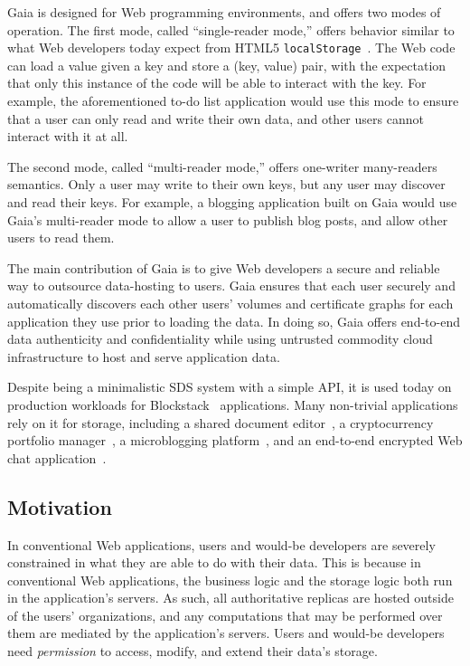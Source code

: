 Gaia is designed for Web programming environments, and offers two
modes of operation.  The first mode, called ``single-reader mode,'' offers
behavior similar to what Web developers today expect from HTML5
\texttt{localStorage}~\cite{w3c-localstorage}.  The Web code can load a value
given a key and store a (key, value) pair, with the expectation that only this
instance of the code will be able to interact with the key.  For example, 
the aforementioned to-do list application would use this mode to ensure that a user can
only read and write their own data, and other users cannot interact with it at
all.

The second mode, called ``multi-reader mode,'' offers one-writer many-readers
semantics.  Only a user may write to their own keys, but any user may discover
and read their keys.  For example, a blogging application built on Gaia would
use Gaia's multi-reader mode to allow a user to publish blog posts, and allow
other users to read them.

The main contribution of Gaia is to give Web developers a secure and
reliable way to outsource data-hosting to users.  Gaia ensures that each user
securely and automatically discovers each other users' volumes and certificate
graphs for each application they use prior to loading the data.
In doing so, Gaia offers end-to-end
data authenticity and confidentiality while using untrusted commodity cloud infrastructure
to host and serve application data.

Despite being a minimalistic SDS system with a simple API, it is used today on
production workloads for Blockstack~\cite{blockstack} applications.  Many
non-trivial applications rely on it for storage, including a shared document
editor~\cite{graphite-docs}, a cryptocurrency portfolio
manager~\cite{coins}, a microblogging
platform~\cite{publick}, and
an end-to-end encrypted Web chat application~\cite{stealthy.im}.

\subsection{Motivation}

In conventional Web applications, users and would-be developers are severely
constrained in what they are able to do with their data.  This is because in
conventional Web applications, the business logic and the storage logic both run
in the application's servers.  As such, all authoritative replicas are hosted
outside of the users' organizations, and any computations that may be performed
over them are mediated by the application's servers.  Users and would-be
developers need \emph{permission} to access, modify, and extend their data's
storage.

